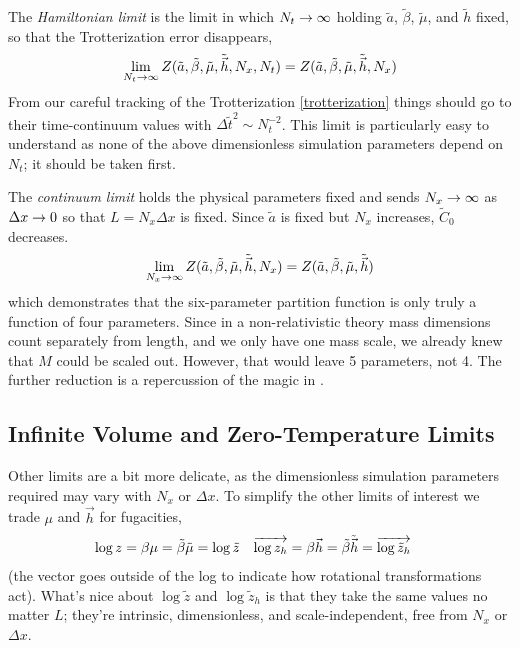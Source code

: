 The \emph{Hamiltonian limit} is the limit in which $N_t\rightarrow\infty$ holding $\tilde{a}$, $\tilde{\beta}$, $\tilde{\mu}$, and $\tilde{h}$ fixed, so that the Trotterization error disappears,
\begin{align}
    \lim_{N_t\rightarrow\infty} Z(\tilde{a}, \tilde{\beta}, \tilde{\mu}, \tilde{\vec{h}}, N_x, N_t)
    =
    Z(\tilde{a}, \tilde{\beta}, \tilde{\mu}, \tilde{\vec{h}}, N_x)
    \label{eq:hamiltonian limit}
\end{align}
From our careful tracking of the Trotterization \eqref{trotterization} things should go to their time-continuum values with $\Delta{\tilde{t}}^2 \sim N_t^{-2}$.
This limit is particularly easy to understand as none of the above dimensionless simulation parameters depend on $N_t$; it should be taken first.

The \emph{continuum limit} holds the physical parameters fixed and sends $N_x \rightarrow \infty$ as $\Delta x\rightarrow 0$ so that $L=N_x \Delta x$ is fixed.
Since $\tilde{a}$ is fixed but $N_x$ increases, $\tilde{C}_0$ decreases.
\begin{align}
    \lim_{N_x\rightarrow\infty} Z(\tilde{a}, \tilde{\beta}, \tilde{\mu}, \tilde{\vec{h}}, N_x) = Z(\tilde{a}, \tilde{\beta}, \tilde{\mu}, \tilde{\vec{h}})
\end{align}
which demonstrates that the six-parameter partition function is only truly a function of four parameters.
Since in a non-relativistic theory mass dimensions count separately from length, and we only have one mass scale, we already knew that $M$ could be scaled out.
However, that would leave 5 parameters, not 4.
The further reduction is a repercussion of the magic in .

\subsection{Infinite Volume and Zero-Temperature Limits}\label{sec:thermodynamic limit}

Other limits are a bit more delicate, as the dimensionless simulation parameters required may vary with $N_x$ or $\Delta x$.
To simplify the other limits of interest we trade $\mu$ and $\vec{h}$ for fugacities,
\begin{align}
    \log z &= \beta \mu = \tilde{\beta} \tilde{\mu} = \log \tilde{z}
    &
    \overrightarrow{\log z_h} &= \beta \vec{h} = \tilde{\beta}\tilde{\vec{h}} = \overrightarrow{\log \tilde{z}_h}
\end{align}
(the vector goes outside of the log to indicate how rotational transformations act).
What's nice about $\log \tilde{z}$ and $\log \tilde{z}_h$ is that they take the same values no matter $L$; they're intrinsic, dimensionless, and scale-independent, free from $N_x$ or $\Delta x$.

